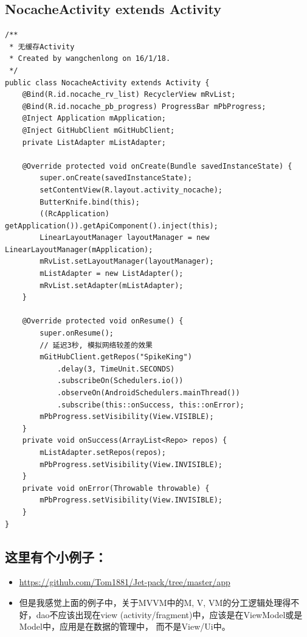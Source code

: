 \documentclass[9pt, b5paper]{article}
\begin{document}
\subsection{NocacheActivity extends Activity}
\label{sec-6-4}
\begin{verbatim}
/**
 * 无缓存Activity
 * Created by wangchenlong on 16/1/18.
 */
public class NocacheActivity extends Activity {
    @Bind(R.id.nocache_rv_list) RecyclerView mRvList;
    @Bind(R.id.nocache_pb_progress) ProgressBar mPbProgress;
    @Inject Application mApplication;
    @Inject GitHubClient mGitHubClient;
    private ListAdapter mListAdapter;

    @Override protected void onCreate(Bundle savedInstanceState) {
        super.onCreate(savedInstanceState);
        setContentView(R.layout.activity_nocache);
        ButterKnife.bind(this);
        ((RcApplication) getApplication()).getApiComponent().inject(this);
        LinearLayoutManager layoutManager = new LinearLayoutManager(mApplication);
        mRvList.setLayoutManager(layoutManager);
        mListAdapter = new ListAdapter();
        mRvList.setAdapter(mListAdapter);
    }

    @Override protected void onResume() {
        super.onResume();
        // 延迟3秒, 模拟网络较差的效果
        mGitHubClient.getRepos("SpikeKing")
            .delay(3, TimeUnit.SECONDS)
            .subscribeOn(Schedulers.io())
            .observeOn(AndroidSchedulers.mainThread())
            .subscribe(this::onSuccess, this::onError);
        mPbProgress.setVisibility(View.VISIBLE);
    }
    private void onSuccess(ArrayList<Repo> repos) {
        mListAdapter.setRepos(repos);
        mPbProgress.setVisibility(View.INVISIBLE);
    }
    private void onError(Throwable throwable) {
        mPbProgress.setVisibility(View.INVISIBLE);
    }
}
\end{verbatim}
\subsection{这里有个小例子：}
\label{sec-6-5}
\begin{itemize}
\item \url{https://github.com/Tom1881/Jet-pack/tree/master/app}
\item 但是我感觉上面的例子中，关于MVVM中的M, V, VM的分工逻辑处理得不好，dao不应该出现在view (activity/fragment)中，应该是在ViewModel或是Model中，应用是在数据的管理中， 而不是View/Ui中。
\end{itemize}
\end{document}
